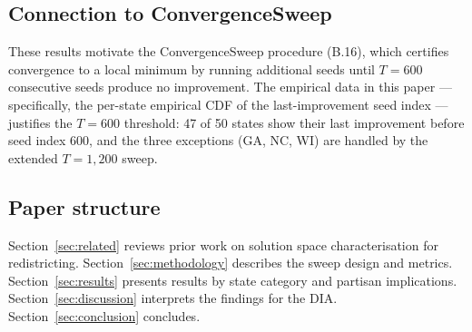\subsection*{Connection to ConvergenceSweep}

These results motivate the ConvergenceSweep procedure (B.16), which
certifies convergence to a local minimum by running additional seeds
until $T = 600$ consecutive seeds produce no improvement.
The empirical data in this paper --- specifically, the per-state
empirical CDF of the last-improvement seed index --- justifies the
$T = 600$ threshold: 47 of 50 states show their last improvement
before seed index 600, and the three exceptions (GA, NC, WI) are
handled by the extended $T = 1{,}200$ sweep.

\subsection*{Paper structure}

Section~\ref{sec:related} reviews prior work on solution space
characterisation for redistricting.
Section~\ref{sec:methodology} describes the sweep design and metrics.
Section~\ref{sec:results} presents results by state category and
partisan implications.
Section~\ref{sec:discussion} interprets the findings for the DIA.
Section~\ref{sec:conclusion} concludes.
